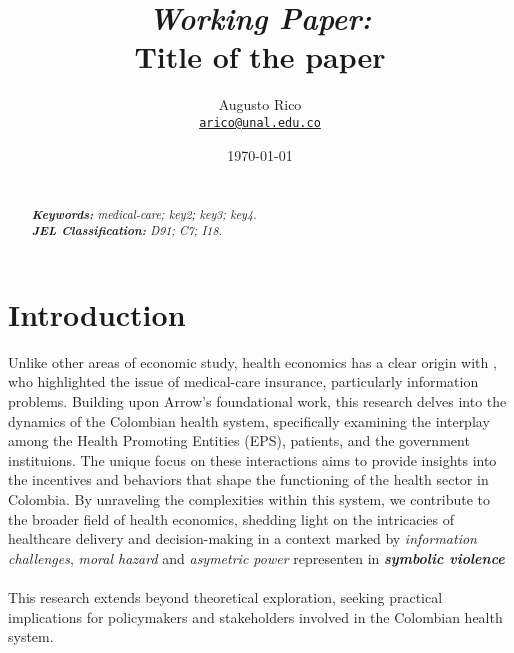 \documentclass[11pt]{article}
\title{\textit{Working Paper:} \\ %
    Title of the paper %
}
\author{Augusto Rico\\
    \href{mailto:arico@unal.edu.co}{\texttt{arico@unal.edu.co}}
    }
\date{\today}
\begin{document}
{ %
\maketitle
\begin{abstract}
\noindent\lipsum[2] %
~\\
\textit{\textbf{Keywords: }%
medical-care; key2; key3; key4.} \\ %
\textit{\textbf{JEL Classification: }%
D91; C7; I18.} %
\end{abstract}}




\section*{Introduction}
\begin{flushleft}
    Unlike other areas of economic study, health economics has a clear origin with \citet{arrow1963uncertainty}, who highlighted the issue of medical-care insurance, particularly information problems. Building upon Arrow's foundational work, this research delves into the dynamics of the Colombian health system, specifically examining the interplay among the Health Promoting Entities (EPS), patients, and the government instituions. The unique focus on these interactions aims to provide insights into the incentives and behaviors that shape the functioning of the health sector in Colombia. By unraveling the complexities within this system, we contribute to the broader field of health economics, shedding light on the intricacies of healthcare delivery and decision-making in a context marked by \textit{information challenges}, \textit{moral hazard} and \textit{asymetric power} representen in \textit{\textbf{symbolic violence}}\\~\\

    
    
    
    
    This research extends beyond theoretical exploration, seeking practical implications for policymakers and stakeholders involved in the Colombian health system.


\end{flushleft}

\newpage

\medskip

\nocite{*}
\printbibliography
\newpage
\end{document}
